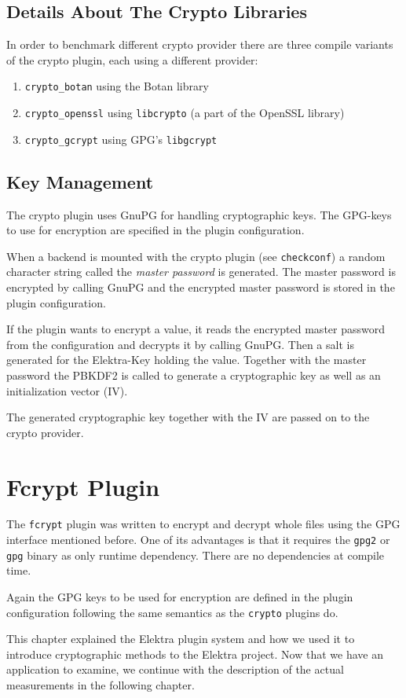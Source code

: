 \subsection{Details About The Crypto
Libraries}\label{details-about-the-crypto-libraries}

In order to benchmark different crypto provider there are three compile
variants of the crypto plugin, each using a different provider:

\begin{enumerate}
\def\labelenumi{\arabic{enumi}.}
\tightlist
\item
  \texttt{crypto\_botan} using the Botan library
\item
  \texttt{crypto\_openssl} using \texttt{libcrypto} (a part of the
  OpenSSL library)
\item
  \texttt{crypto\_gcrypt} using GPG's \texttt{libgcrypt}
\end{enumerate}

\subsection{Key Management}\label{key-management}

The crypto plugin uses GnuPG for handling cryptographic keys. The
GPG-keys to use for encryption are specified in the plugin
configuration.

When a backend is mounted with the crypto plugin (see
\texttt{checkconf}) a random character string called the \emph{master
password} is generated. The master password is encrypted by calling
GnuPG and the encrypted master password is stored in the plugin
configuration.

If the plugin wants to encrypt a value, it reads the encrypted master
password from the configuration and decrypts it by calling GnuPG. Then a
salt is generated for the Elektra-Key holding the value. Together with
the master password the PBKDF2 is called to generate a cryptographic key
as well as an initialization vector (IV).

The generated cryptographic key together with the IV are passed on to
the crypto provider.

\section{Fcrypt Plugin}\label{fcrypt-plugin}

The \texttt{fcrypt} plugin was written to encrypt and decrypt whole
files using the GPG interface mentioned before. One of its advantages is
that it requires the \texttt{gpg2} or \texttt{gpg} binary as only
runtime dependency. There are no dependencies at compile time.

Again the GPG keys to be used for encryption are defined in the plugin
configuration following the same semantics as the \texttt{crypto}
plugins do.

This chapter explained the Elektra plugin system and how we used it to introduce cryptographic methods to the Elektra project.
Now that we have an application to examine, we continue with the description of the actual measurements in the following chapter.
